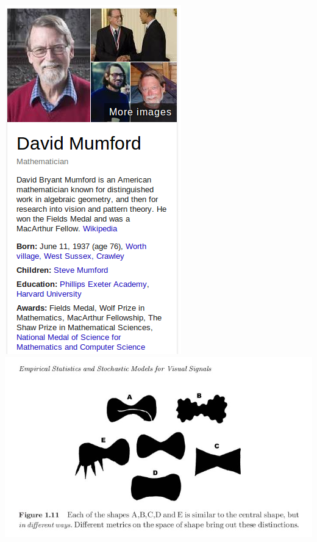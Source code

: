 \begin{frame}
\begin{columns}[c]
\includegraphics[width=\textwidth]{mumford}
\includegraphics[width=\textwidth]{mumford_fig}
\end{columns}
\end{frame}


